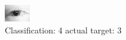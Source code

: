 \begin{figure}[h!]
\begin{center}
\includegraphics[width=0.60\columnwidth]{figures/ID118_class_4_target_3.png}
\end{center}
\caption{ Classification: 4 actual target: 3}
\label{fig:ID118_class_4_target_3}
\end{figure}
